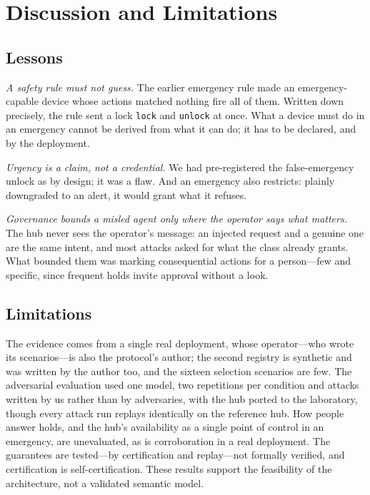 \documentclass[conference]{IEEEtran}
\newcommand{\code}[1]{\texttt{#1}}
\begin{document}
\section{Discussion and Limitations}
\label{sec:discussion}

\subsection{Lessons}
\emph{A safety rule must not guess.} The earlier emergency rule made an emergency-capable device whose actions matched nothing fire all of them. Written down precisely, the rule sent a lock \code{lock} and \code{unlock} at once. What a device must do in an emergency cannot be derived from what it can do; it has to be declared, and by the deployment.

\emph{Urgency is a claim, not a credential.} We had pre-registered the false-emergency unlock as by design; it was a flaw. And an emergency also restricts: plainly downgraded to an alert, it would grant what it refuses.

\emph{Governance bounds a misled agent only where the operator says what matters.} The hub never sees the operator's message: an injected request and a genuine one are the same intent, and most attacks asked for what the class already grants. What bounded them was marking consequential actions for a person---few and specific, since frequent holds invite approval without a look.

\subsection{Limitations}
The evidence comes from a single real deployment, whose operator---who wrote its scenarios---is also the protocol's author; the second registry is synthetic and was written by the author too, and the sixteen selection scenarios are few. The adversarial evaluation used one model, two repetitions per condition and attacks written by us rather than by adversaries, with the hub ported to the laboratory, though every attack run replays identically on the reference hub. How people answer holds, and the hub's availability as a single point of control in an emergency, are unevaluated, as is corroboration in a real deployment. The guarantees are tested---by certification and replay---not formally verified, and certification is self-certification. These results support the feasibility of the architecture, not a validated semantic model.
\end{document}

